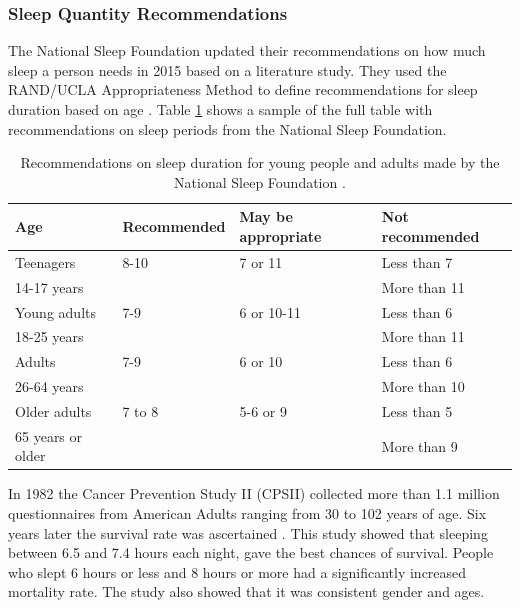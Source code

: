 \documentclass[12pt]{article} %
\begin{document}
\subsubsection{Sleep Quantity Recommendations}
The National Sleep Foundation updated their recommendations on how much sleep a person needs in 2015 based on a literature study. They used the RAND/UCLA Appropriateness Method to define recommendations for sleep duration based on age \cite{duration}. Table \ref{tab:recommendation} shows a sample of the full table with recommendations on sleep periods from the National Sleep Foundation. 

\begin{table}[H]
\center
\begin{footnotesize}
	\begin{tabular}{|p{2.5cm} |p{3.3cm} |p{3.5cm} |p{3.5cm} |}
	\hline
	\textbf{Age} & \textbf{Recommended} & \textbf{May be appropriate} & \textbf{Not recommended} \\
	\hline
Teenagers & 8-10 & 7 or 11 & Less than 7\\
14-17 years & & & More than 11\\
	\hline
Young adults & 7-9 & 6 or 10-11 & Less than 6\\
18-25 years & & & More than 11\\
	\hline
Adults & 7-9 & 6 or 10 & Less than 6\\
26-64 years & & & More than 10\\
	\hline
Older adults & 7 to 8 & 5-6 or 9 & Less than 5\\
65 years or older & & & More than 9\\
	\hline
	\end{tabular}
	\caption{Recommendations on sleep duration for young people and adults made by the National Sleep Foundation \cite{duration}.}
	\label{tab:recommendation}
\end{footnotesize}
\end{table}

In 1982 the Cancer Prevention Study II (CPSII) collected more than 1.1 million questionnaires from American Adults ranging from 30 to 102 years of age. Six years later the survival rate was ascertained \cite{arch}. This study showed that sleeping between 6.5 and 7.4 hours each night, gave the best chances of survival. People who slept 6 hours or less and 8 hours or more had a significantly increased mortality rate. The study also showed that it was consistent gender and ages. \\
\end{document}
